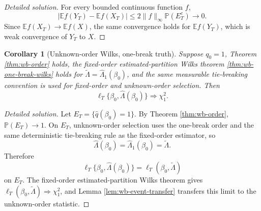 \documentclass[12pt]{article}
\numberwithin{equation}{section}
\newtheorem{corollary}{Corollary}
\theoremstyle{definition}
\newcommand{\E}{\mathbb E}
\newcommand{\Pp}{\mathbb P}
\begin{document}
\begin{proof}[Detailed solution]
For every bounded continuous function \(f\),
\[
    |\E f(Y_T)-\E f(X_T)|
    \leq 2\|f\|_\infty\Pp(E_T^c)\to0.
\]
Since \(\E f(X_T)\to\E f(X)\), the same convergence holds for
\(\E f(Y_T)\), which is weak convergence of \(Y_T\) to \(X\).
\end{proof}

\begin{corollary}[Unknown-order Wilks, one-break truth]
\label{cor:wb-unknown-wilks}
Suppose \(q_0=1\), Theorem \ref{thm:wb-order} holds, the fixed-order
estimated-partition Wilks theorem \ref{thm:wb-one-break-wilks} holds for
\(\widetilde\Lambda=\widehat\Lambda_{1}(\beta_0)\), and the same measurable
tie-breaking convention is used for fixed-order and unknown-order selection.
Then
\[
    \ell_T\{\beta_0,\widehat\Lambda(\beta_0)\}\Rightarrow\chi_1^2.
\]
\end{corollary}

\begin{proof}[Detailed solution]
Let \(E_T=\{\widehat q(\beta_0)=1\}\).  By Theorem
\ref{thm:wb-order}, \(\Pp(E_T)\to1\).  On \(E_T\), unknown-order
selection uses the one-break order and the same deterministic tie-breaking
rule as the fixed-order estimator, so
\[
    \widehat\Lambda(\beta_0)=\widehat\Lambda_{1}(\beta_0)
    =\widetilde\Lambda.
\]
Therefore
\[
    \ell_T\{\beta_0,\widehat\Lambda(\beta_0)\}
    =\ell_T(\beta_0,\widetilde\Lambda)
\]
on \(E_T\).  The fixed-order estimated-partition Wilks theorem gives
\( \ell_T(\beta_0,\widetilde\Lambda)\Rightarrow\chi_1^2 \), and Lemma
\ref{lem:wb-event-transfer} transfers this limit to the unknown-order
statistic.
\end{proof}
\end{document}
